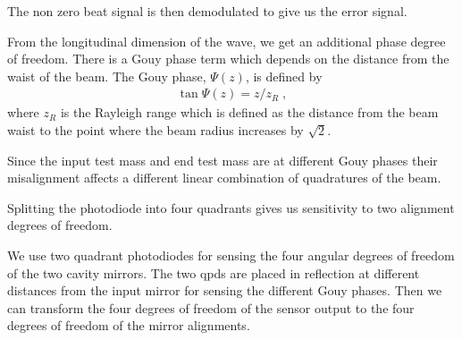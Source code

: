 


The non zero beat signal is then demodulated to give us the error signal.



From the longitudinal dimension of the wave, we get an additional phase degree
of freedom. There is a Gouy phase term which depends on the distance from the waist
of the beam. The Gouy phase, $\Psi(z)$, is defined by
\begin{align*}
  \tan{\Psi(z)} = z/z_R \;,
\end{align*}
where $z_R$ is the Rayleigh range which is defined as the distance from the beam
waist to the point where the beam radius increases by $\sqrt{2}$.


Since the input test mass and end test mass are at different Gouy phases
their misalignment affects a different linear combination of quadratures of the
beam.


Splitting the photodiode into four quadrants gives us sensitivity to two
alignment degrees of freedom.

%
%

We use two quadrant photodiodes for sensing the four angular degrees
of freedom of the two cavity mirrors.
The two \ac{qpd}s are placed in reflection at different distances from the
input mirror for sensing the different Gouy phases.
Then we can transform the four degrees of freedom of the sensor output to the
four degrees of freedom of the mirror alignments.




